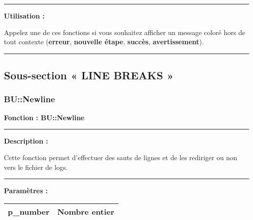\documentclass[a4paper,10pt]{article}
\begin{document}

\par\noindent\rule{\textwidth}{0.4pt}

\begin{justify}
    \textbf{Utilisation :}

    Appelez une de ces fonctions si vous souhaitez afficher un message coloré hors de tout contexte (\textbf{\color{Red}erreur}, \textbf{\color{Orange}nouvelle étape}, \textbf{\color{Green}succès}, \textbf{\color{Yellow}avertissement}).
\end{justify}




\color{sec2}\par\noindent\rule{\textwidth}{0.4pt}\color{text}\setlength{\parskip}{1em}

\color{sec2}
\subsection{Sous-section « LINE BREAKS »}\color{text}

\color{sec3}
\subsubsection{BU::Newline}\color{text}

\begin{justify}
    \textbf{Fonction : \textbf{\color{func}BU::Newline}}
\end{justify}


\par\noindent\rule{\textwidth}{0.4pt}

\begin{justify}
    \textbf{Description :}

    Cette fonction permet d'effectuer des sauts de lignes et de les rediriger ou non vers le fichier de logs.
\end{justify}


\par\noindent\rule{\textwidth}{0.4pt}

\begin{justify}
    \textbf{Paramètres :}

    \begin{tabular}{|l|l|}
        \hline
        \textbf{\color{vars}p\_number} & Nombre entier\\
        \hline
    \end{tabular}
\end{justify}
\end{document}
